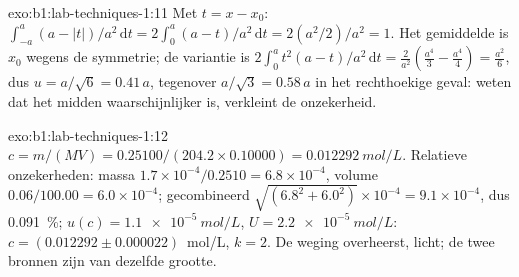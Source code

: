 \begin{solution}{exo:b1:lab-techniques-1:11}
Met $t = x - x_0$: $\int_{-a}^{a} (a - |t|)/a^2 \,\mathrm{d}t =
2 \int_0^a (a - t)/a^2 \,\mathrm{d}t = 2 (a^2/2)/a^2 = 1$. Het gemiddelde
is $x_0$ wegens de symmetrie; de variantie is $2 \int_0^a t^2 (a - t)/a^2
\,\mathrm{d}t = \frac{2}{a^2}\left(\frac{a^4}{3} - \frac{a^4}{4}\right) =
\frac{a^2}{6}$, dus $u = a/\sqrt6 = 0.41\,a$, tegenover $a/\sqrt3 = 0.58\,a$
in het rechthoekige geval: weten dat het midden waarschijnlijker is,
verkleint de onzekerheid.
\end{solution}

\begin{solution}{exo:b1:lab-techniques-1:12}
$c = m/(MV) = 0.25100/(204.2 \times 0.10000) = \qty{0.012292}{mol/L}$.
Relatieve onzekerheden: massa $1.7 \times 10^{-4}/0.2510 = 6.8 \times
10^{-4}$, volume $0.06/100.00 = 6.0 \times 10^{-4}$; gecombineerd
$\sqrt{(6.8^2 + 6.0^2)} \times 10^{-4} = 9.1 \times 10^{-4}$, dus
\qty{0.091}{\percent}; $u(c) = \qty{1.1e-5}{mol/L}$, $U = \qty{2.2e-5}{mol/L}$:
$c = (0.012292 \pm 0.000022)$~mol/L, $k = 2$. De weging overheerst,
licht; de twee bronnen zijn van dezelfde grootte.
\end{solution}

